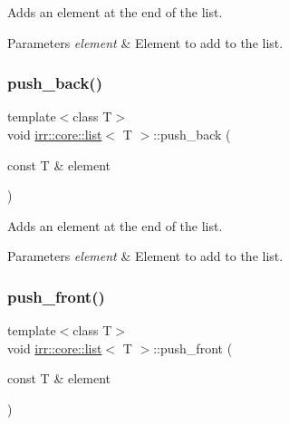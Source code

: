 Adds an element at the end of the list. 


\begin{DoxyParams}{Parameters}
{\em element} & Element to add to the list. \\
\hline
\end{DoxyParams}
\mbox{\label{classirr_1_1core_1_1list_a0f73ebd87279766f339cb1462c2a24d1}} 
\subsubsection{\texorpdfstring{push\+\_\+back()}{push\_back()}\hspace{0.1cm}{\footnotesize\ttfamily [2/2]}}
{\footnotesize\ttfamily template$<$class T$>$ \\
void \hyperlink{classirr_1_1core_1_1list}{irr\+::core\+::list}$<$ T $>$\+::push\+\_\+back (\begin{DoxyParamCaption}\item[{const T \&}]{element }\end{DoxyParamCaption})\hspace{0.3cm}{\ttfamily [inline]}}



Adds an element at the end of the list. 


\begin{DoxyParams}{Parameters}
{\em element} & Element to add to the list. \\
\hline
\end{DoxyParams}
\mbox{\label{classirr_1_1core_1_1list_aec58963596cbc0435e706d1d00777b61}} 
\subsubsection{\texorpdfstring{push\+\_\+front()}{push\_front()}\hspace{0.1cm}{\footnotesize\ttfamily [1/2]}}
{\footnotesize\ttfamily template$<$class T$>$ \\
void \hyperlink{classirr_1_1core_1_1list}{irr\+::core\+::list}$<$ T $>$\+::push\+\_\+front (\begin{DoxyParamCaption}\item[{const T \&}]{element }\end{DoxyParamCaption})\hspace{0.3cm}{\ttfamily [inline]}}



